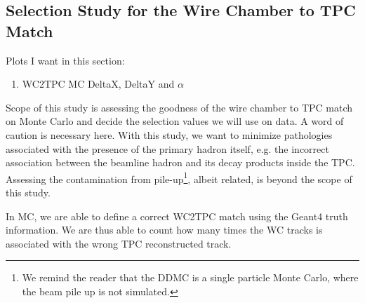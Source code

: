 


\subsection{Selection Study for the Wire Chamber to TPC Match}\label{ch:WC2TPCMatchOptimization}
Plots I want in this section:
\begin{enumerate}
\item WC2TPC MC DeltaX, DeltaY and $\alpha$
\end{enumerate}


Scope of this study is assessing the goodness of the wire chamber to TPC match on Monte Carlo and decide the selection values we will use on data. A word of caution is necessary here. With this study, we want to minimize pathologies associated with the presence of the primary hadron itself, e.g. the incorrect association between the beamline hadron and its decay products inside the TPC.  Assessing the contamination from pile-up\footnote{We remind the reader that the DDMC is a single particle Monte Carlo, where the beam pile up is not simulated.}, albeit related, is beyond the scope of this study.

In MC, we are able to define a correct WC2TPC match using the Geant4 truth information. We are thus able to count how many times the WC tracks is associated with the wrong TPC reconstructed track. 

